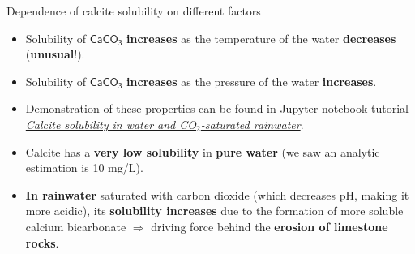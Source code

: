 \begin{frame}{Dependence of calcite solubility on different factors}
\begin{itemize}
\item Solubility of $\mathsf{CaCO_3}$ \textbf{increases} as the temperature of the water \textbf{decreases} ({\bf unusual}!).
\item Solubility of $\mathsf{CaCO_3}$ \textbf{increases} as the pressure of the water \textbf{increases}.
\item Demonstration of these properties can be found in Jupyter notebook tutorial 
\href{}{\textcolor{indigo(dye)}{\it Calcite solubility in water and CO$_2$-saturated rainwater}}.
%
\item Calcite has a \textbf{very low solubility} in \textbf{pure water} (we saw an analytic estimation is 10 \mbox{mg/L}).
\item \textbf{In rainwater} saturated with carbon dioxide (which decreases pH, making it more acidic), its \textbf{solubility increases} due to the formation of more soluble calcium bicarbonate 
$\Rightarrow$
%
driving force behind the {\bf erosion of limestone rocks}.
\end{itemize}
\end{frame}

